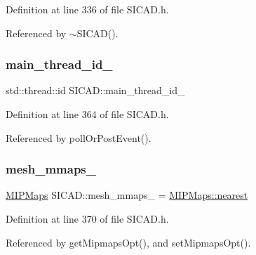 Definition at line 336 of file S\+I\+C\+A\+D.\+h.



Referenced by $\sim$\+S\+I\+C\+A\+D().

\mbox{\label{classSICAD_a6a4623d27b2ee48ad0db90bd075c708c}} 
\subsubsection{\texorpdfstring{main\+\_\+thread\+\_\+id\+\_\+}{main\_thread\_id\_}}
{\footnotesize\ttfamily std\+::thread\+::id S\+I\+C\+A\+D\+::main\+\_\+thread\+\_\+id\+\_\+\hspace{0.3cm}{\ttfamily [private]}}



Definition at line 364 of file S\+I\+C\+A\+D.\+h.



Referenced by poll\+Or\+Post\+Event().

\mbox{\label{classSICAD_a34b0de96321855145937cc5858c019b0}} 
\subsubsection{\texorpdfstring{mesh\+\_\+mmaps\+\_\+}{mesh\_mmaps\_}}
{\footnotesize\ttfamily \mbox{\hyperlink{classSICAD_a7e092dede6f660355462d6d548214198}{M\+I\+P\+Maps}} S\+I\+C\+A\+D\+::mesh\+\_\+mmaps\+\_\+ = \mbox{\hyperlink{classSICAD_a7e092dede6f660355462d6d548214198ad879c351426770bc0b13c3628db1e636}{M\+I\+P\+Maps\+::nearest}}\hspace{0.3cm}{\ttfamily [private]}}



Definition at line 370 of file S\+I\+C\+A\+D.\+h.



Referenced by get\+Mipmaps\+Opt(), and set\+Mipmaps\+Opt().

\mbox{\label{classSICAD_a05fea2b5b027a3b7f37ef9ea4ecd64f0}} 
